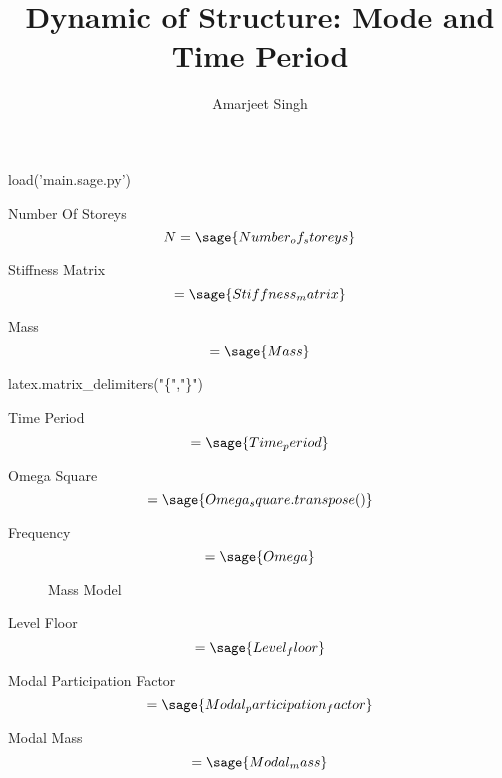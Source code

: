 \documentclass[12pt]{report}
\title{Dynamic of Structure: Mode and Time Period}
\author{Amarjeet Singh }
\begin{document}
\thispagestyle{plain}
	\begin{titlepage}
\maketitle
	\end{titlepage}

\begin{sagesilent}
	load('main.sage.py')

\end{sagesilent}

Number Of Storeys
\begin{equation}
	N = \sage{Number_of_storeys}
\end{equation}

Stiffness Matrix
\begin{equation}
	[K]=\sage{Stiffness_matrix}
\end{equation}

Mass
\begin{equation}
	 [M]=\sage{Mass}
\end{equation}


\begin{sagesilent}
latex.matrix_delimiters("\{","\}")
\end{sagesilent}

Time Period
\begin{equation}
	[T]=\sage{Time_period}
\end{equation}

Omega Square
\begin{equation}
	[\omega^2] =\sage{Omega_square.transpose()}
\end{equation}

Frequency
\begin{equation}
	[\omega]=\sage{Omega}
\end{equation}

\begin{figure}
	\caption{Mass Model}
\end{figure}

Level Floor
\begin{equation}
	[L]=\sage{Level_floor}
\end{equation}

Modal Participation Factor
\begin{equation}
	 [p]=\sage{Modal_participation_factor}
\end{equation}

Modal Mass
\begin{equation}
	 [M_{{m}}]=\sage{Modal_mass}
\end{equation}
\end{document}

